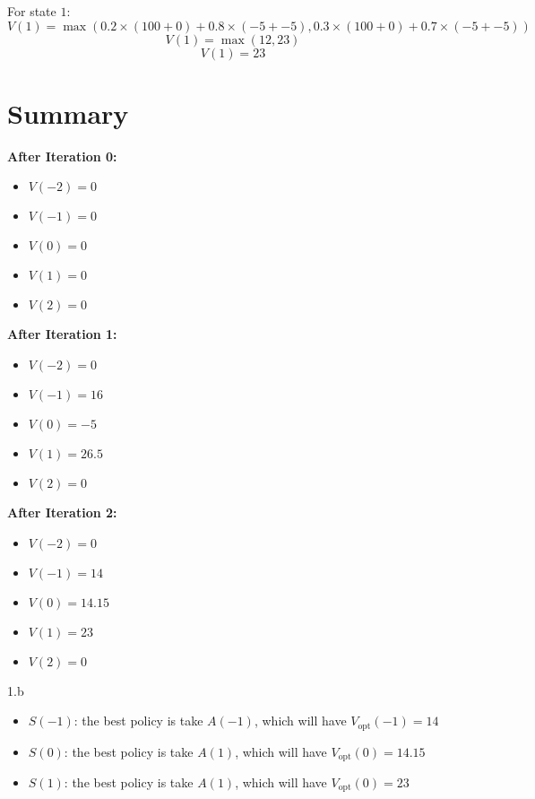 \begin{answer}
  For state $1$:
  \[
  V(1) = \max\left(0.2 \times (100 + 0) + 0.8 \times (-5 + -5), 0.3 \times (100 + 0) + 0.7 \times (-5 + -5)\right)
  \]
  \[
  V(1) = \max(12, 23)
  \]
  \[
  V(1) = 23
  \]
  
  \section*{Summary}
  
  \textbf{After Iteration 0:}
  
  \begin{itemize}
      \item $V(-2) = 0$
      \item $V(-1) = 0$
      \item $V(0) = 0$
      \item $V(1) = 0$
      \item $V(2) = 0$
  \end{itemize}
  
  \textbf{After Iteration 1:}
  
  \begin{itemize}
      \item $V(-2) = 0$
      \item $V(-1) = 16$
      \item $V(0) = -5$
      \item $V(1) = 26.5$
      \item $V(2) = 0$
  \end{itemize}
  
  \textbf{After Iteration 2:}
  
  \begin{itemize}
      \item $V(-2) = 0$
      \item $V(-1) = 14$
      \item $V(0) = 14.15$
      \item $V(1) = 23$
      \item $V(2) = 0$
  \end{itemize}
  
  
\end{answer}
\clearpage

\LARGE
1.b
\normalsize

\begin{answer}
  \begin{itemize}
    \item $S(-1)$: the best policy is take $A(-1)$, which will have $V_{\text{opt}}(-1) = 14$
    \item $S(0)$: the best policy is take $A(1)$, which will have $V_{\text{opt}}(0) = 14.15$
    \item $S(1)$: the best policy is take $A(1)$, which will have $V_{\text{opt}}(0) = 23$
\end{itemize}
\end{answer}
\clearpage

